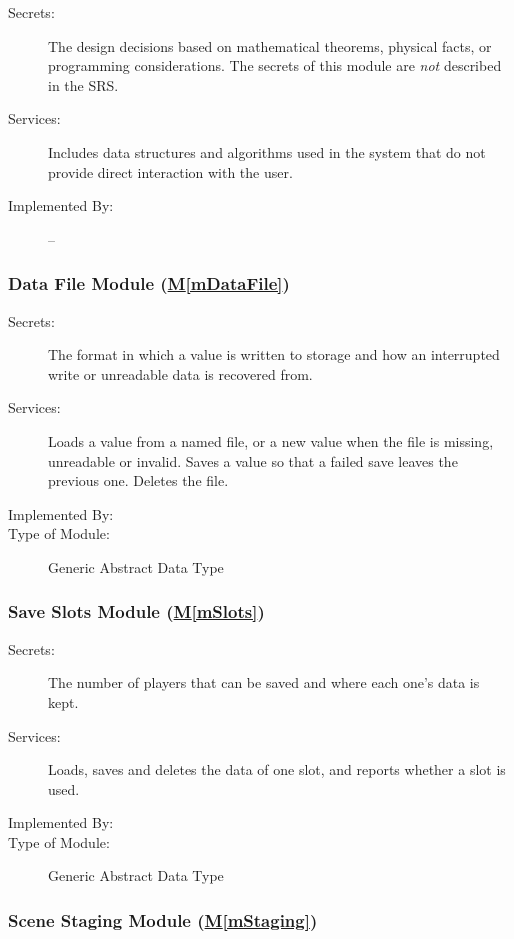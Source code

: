 \documentclass[12pt, titlepage]{article}
\newcommand{\mref}[1]{\hyperref[#1]{M\ref*{#1}}}
\begin{document}
\begin{description}
\item[Secrets:] The design decisions based on mathematical theorems, physical
  facts, or programming considerations. The secrets of this module are
  \emph{not} described in the SRS.
\item[Services:] Includes data structures and algorithms used in the system
  that do not provide direct interaction with the user.
\item[Implemented By:] --
\end{description}

\subsubsection{Data File Module (\mref{mDataFile})}

\begin{description}
\item[Secrets:] The format in which a value is written to storage and how an
  interrupted write or unreadable data is recovered from.
\item[Services:] Loads a value from a named file, or a new value when the file
  is missing, unreadable or invalid. Saves a value so that a failed save leaves
  the previous one. Deletes the file.
\item[Implemented By:] \progname{}
\item[Type of Module:] Generic Abstract Data Type
\end{description}

\subsubsection{Save Slots Module (\mref{mSlots})}

\begin{description}
\item[Secrets:] The number of players that can be saved and where each one's
  data is kept.
\item[Services:] Loads, saves and deletes the data of one slot, and reports
  whether a slot is used.
\item[Implemented By:] \progname{}
\item[Type of Module:] Generic Abstract Data Type
\end{description}

\subsubsection{Scene Staging Module (\mref{mStaging})}
\end{document}
